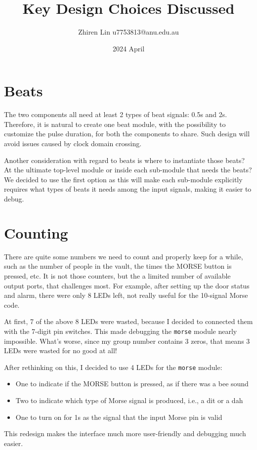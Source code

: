 \documentclass[4apaper,12pt]{article}
\title{Key Design Choices Discussed}
\date{2024 April}
\author{Zhiren Lin u7753813@anu.edu.au}
\begin{document}
\maketitle
\section{Beats}
The two components all need at least 2 types of beat signals: 0.5s and 2s.  Therefore, it is natural to create one beat module, with the possibility to customize the pulse duration, for both the components to share.  Such design will avoid issues caused by clock domain crossing.

Another consideration with regard to beats is where to instantiate those beats? At the ultimate top-level module or inside each sub-module that needs the beats?  We decided to use the first option as this will make each sub-module explicitly requires what types of beats it needs among the input signals, making it easier to debug.

\section{Counting}
There are quite some numbers we need to count and properly keep for a while, such as the number of people in the vault, the times the MORSE button is pressed, etc.  It is not those counters, but the a limited number of available output ports, that challenges most.  For example, after setting up the door status and alarm, there were only 8 LEDs left, not really useful for the 10-signal Morse code.

At first, 7 of the above 8 LEDs were wasted, because I decided to connected them with the 7-digit pin switches. This made debugging the \texttt{morse} module nearly impossible.  What's worse, since my group number contains 3 zeros, that means 3 LEDs were wasted for no good at all!

After rethinking on this, I decided to use 4 LEDs for the \texttt{morse} module:
\begin{itemize}
\item One to indicate if the MORSE button is pressed, as if there was a bee sound
\item Two to indicate which type of Morse signal is produced, i.e., a dit or a dah
\item One to turn on for 1s as the signal that the input Morse pin is valid
\end{itemize}
This redesign makes the interface much more user-friendly and debugging much easier.
\end{document}
